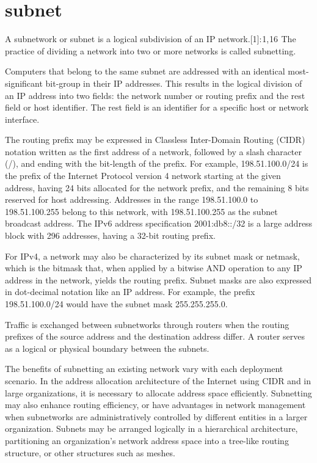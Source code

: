 \documentclass[a4paper,12pt]{book}
\begin{document}
\section{subnet}
A subnetwork or subnet is a logical subdivision of an IP network.[1]: 1, 16  The practice of dividing a network into two or more networks is called subnetting.

Computers that belong to the same subnet are addressed with an identical most-significant bit-group in their IP addresses. This results in the logical division of an IP address into two fields: the network number or routing prefix and the rest field or host identifier. The rest field is an identifier for a specific host or network interface.

The routing prefix may be expressed in Classless Inter-Domain Routing (CIDR) notation written as the first address of a network, followed by a slash character (/), and ending with the bit-length of the prefix. For example, 198.51.100.0/24 is the prefix of the Internet Protocol version 4 network starting at the given address, having 24 bits allocated for the network prefix, and the remaining 8 bits reserved for host addressing. Addresses in the range 198.51.100.0 to 198.51.100.255 belong to this network, with 198.51.100.255 as the subnet broadcast address. The IPv6 address specification 2001:db8::/32 is a large address block with 296 addresses, having a 32-bit routing prefix.

For IPv4, a network may also be characterized by its subnet mask or netmask, which is the bitmask that, when applied by a bitwise AND operation to any IP address in the network, yields the routing prefix. Subnet masks are also expressed in dot-decimal notation like an IP address. For example, the prefix 198.51.100.0/24 would have the subnet mask 255.255.255.0.

Traffic is exchanged between subnetworks through routers when the routing prefixes of the source address and the destination address differ. A router serves as a logical or physical boundary between the subnets.

The benefits of subnetting an existing network vary with each deployment scenario. In the address allocation architecture of the Internet using CIDR and in large organizations, it is necessary to allocate address space efficiently. Subnetting may also enhance routing efficiency, or have advantages in network management when subnetworks are administratively controlled by different entities in a larger organization. Subnets may be arranged logically in a hierarchical architecture, partitioning an organization's network address space into a tree-like routing structure, or other structures such as meshes.
\end{document}
